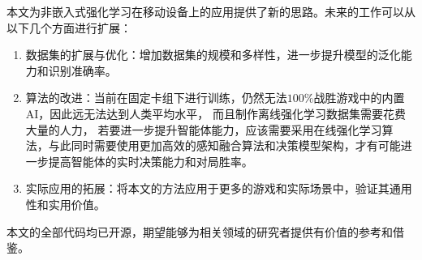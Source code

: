 本文为非嵌入式强化学习在移动设备上的应用提供了新的思路。未来的工作可以从以下几个方面进行扩展：
\begin{enumerate}
  \item 数据集的扩展与优化：增加数据集的规模和多样性，进一步提升模型的泛化能力和识别准确率。
  \item 算法的改进：当前在固定卡组下进行训练，仍然无法$100\%$战胜游戏中的内置AI，因此远无法达到人类平均水平，
  而且制作离线强化学习数据集需要花费大量的人力，
  若要进一步提升智能体能力，应该需要采用在线强化学习算法，与此同时需要使用更加高效的感知融合算法和决策模型架构，才有可能进一步提高智能体的实时决策能力和对局胜率。
  \item 实际应用的拓展：将本文的方法应用于更多的游戏和实际场景中，验证其通用性和实用价值。
\end{enumerate}

本文的全部代码均已开源，期望能够为相关领域的研究者提供有价值的参考和借鉴。